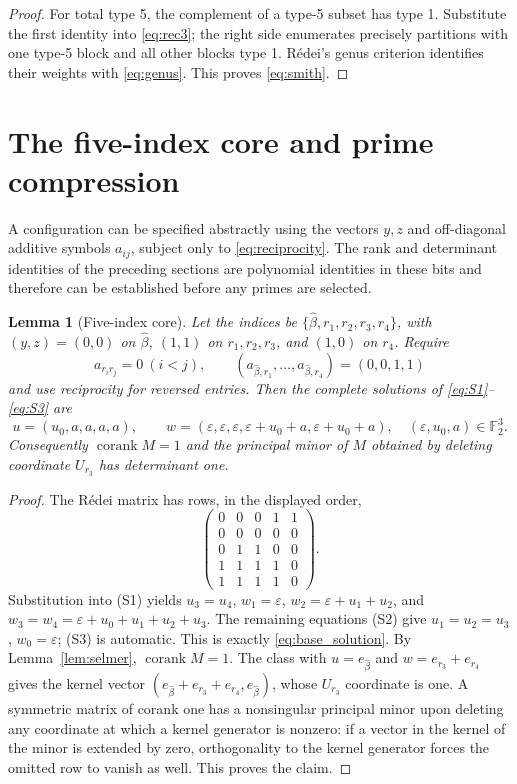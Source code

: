 \documentclass[11pt,a4paper]{article}
\newtheorem{lemma}[theorem]{Lemma}
\theoremstyle{definition}
\newcommand{\FF}{\mathbb F_2}
\newcommand{\corank}{\operatorname{corank}}
\begin{document}
\begin{proof}
For total type 5, the complement of a type-5 subset
has type 1.  Substitute the first identity into
\eqref{eq:rec3}; the right side enumerates precisely
partitions with one type-5 block and all other blocks
type 1.  R\'edei's genus criterion identifies their
weights with \eqref{eq:genus}.  This proves
\eqref{eq:smith}.
\end{proof}

\section{The five-index core and prime compression}\label{sec:core}

A configuration can be specified abstractly using the
vectors $y,z$ and off-diagonal additive symbols $a_{ij}$,
subject only to \eqref{eq:reciprocity}.  The rank and
determinant identities of the preceding sections are
polynomial identities in these bits and therefore can be
established before any primes are selected.

\begin{lemma}[Five-index core]\label{lem:five}
Let the indices be $\{\widehat\beta,r_1,r_2,r_3,r_4\}$,
with $(y,z)=(0,0)$ on $\widehat\beta$, $(1,1)$ on
$r_1,r_2,r_3$, and $(1,0)$ on $r_4$.  Require
\[
 a_{r_i r_j}=0\ (i<j),\qquad
 (a_{\widehat\beta,r_1},\dots,a_{\widehat\beta,r_4})
              =(0,0,1,1)
\]
and use reciprocity for reversed entries.  Then the
complete solutions of \eqref{eq:S1}--\eqref{eq:S3} are
\begin{equation}\label{eq:base_solution}
 u=(u_0,a,a,a,a),\qquad
 w=(\varepsilon,\varepsilon,\varepsilon,
       \varepsilon+u_0+a,\varepsilon+u_0+a),
     \quad (\varepsilon,u_0,a)\in\FF^3.
\end{equation}
Consequently $\corank M=1$ and the principal minor of $M$
obtained by deleting coordinate $U_{r_3}$ has determinant one.
\end{lemma}
\begin{proof}
The R\'edei matrix has rows, in the displayed order,
\[
 \begin{pmatrix}
 0&0&0&1&1\\0&0&0&0&0\\0&1&1&0&0\\
 1&1&1&1&0\\1&1&1&1&0
 \end{pmatrix}.
\]
Substitution into (S1) yields
\(u_3=u_4\), \(w_1=\varepsilon\),
\(w_2=\varepsilon+u_1+u_2\), and
\(w_3=w_4=\varepsilon+u_0+u_1+u_2+u_3\).
The remaining equations (S2) give
$u_1=u_2=u_3$, $w_0=\varepsilon$; (S3) is automatic.
This is exactly \eqref{eq:base_solution}.
By Lemma~\ref{lem:selmer}, $\corank M=1$.
The class with $u=e_{\widehat\beta}$ and
$w=e_{r_3}+e_{r_4}$ gives the kernel vector
$(e_{\widehat\beta}+e_{r_3}+e_{r_4},
  e_{\widehat\beta})$, whose $U_{r_3}$ coordinate is
one.  A symmetric matrix of corank one has a nonsingular
principal minor upon deleting any coordinate at which
a kernel generator is nonzero: if a vector in the kernel
of the minor is extended by zero, orthogonality to the
kernel generator forces the omitted row to vanish as well.
This proves the claim.
\end{proof}
\end{document}

